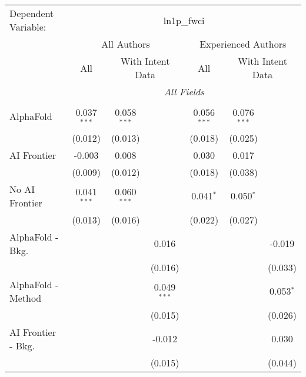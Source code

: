 \begingroup
\centering
\begin{tabular}{lcccccc}
   \tabularnewline \midrule \midrule
   Dependent Variable: & \multicolumn{6}{c}{ln1p\_fwci}\\
 & \multicolumn{3}{c}{All Authors} & \multicolumn{3}{c}{Experienced Authors} \\
\cmidrule(lr){2-4} \cmidrule(lr){5-7}
 & \multicolumn{1}{c}{All} & \multicolumn{2}{c}{With Intent Data} & \multicolumn{1}{c}{All} & \multicolumn{2}{c}{With Intent Data} \\
\cmidrule(lr){2-2} \cmidrule(lr){3-4} \cmidrule(lr){5-5} \cmidrule(lr){6-7}
 & \multicolumn{6}{c}{\textit{All Fields}} \\ \\
   AlphaFold               & 0.037$^{***}$ & 0.058$^{***}$ &               & 0.056$^{***}$ & 0.076$^{***}$ &   \\   
                           & (0.012)       & (0.013)       &               & (0.018)       & (0.025)       &   \\   
   AI Frontier             & -0.003        & 0.008         &               & 0.030         & 0.017         &   \\   
                           & (0.009)       & (0.012)       &               & (0.018)       & (0.038)       &   \\   
   No AI Frontier          & 0.041$^{***}$ & 0.060$^{***}$ &               & 0.041$^{*}$   & 0.050$^{*}$   &   \\   
                           & (0.013)       & (0.016)       &               & (0.022)       & (0.027)       &   \\   
   AlphaFold - Bkg.        &               &               & 0.016         &               &               & -0.019\\   
                           &               &               & (0.016)       &               &               & (0.033)\\   
   AlphaFold - Method      &               &               & 0.049$^{***}$ &               &               & 0.053$^{*}$\\   
                           &               &               & (0.015)       &               &               & (0.026)\\   
   AI Frontier - Bkg.      &               &               & -0.012        &               &               & 0.030\\   
                           &               &               & (0.015)       &               &               & (0.044)\\   

\end{tabular}
